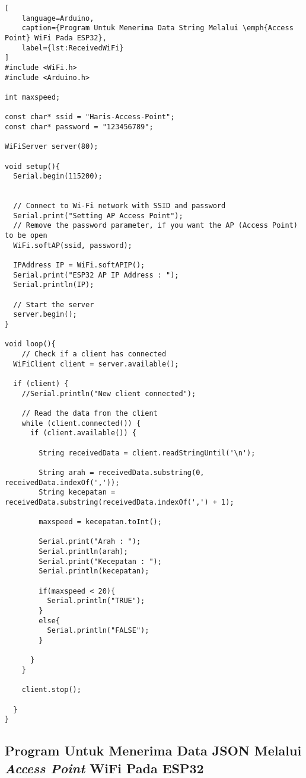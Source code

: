 \begin{lstlisting}[
    language=Arduino,
    caption={Program Untuk Menerima Data String Melalui \emph{Access Point} WiFi Pada ESP32},
    label={lst:ReceivedWiFi}
]
#include <WiFi.h>
#include <Arduino.h>

int maxspeed;

const char* ssid = "Haris-Access-Point";
const char* password = "123456789";

WiFiServer server(80);

void setup(){
  Serial.begin(115200);


  // Connect to Wi-Fi network with SSID and password
  Serial.print("Setting AP Access Point");
  // Remove the password parameter, if you want the AP (Access Point) to be open
  WiFi.softAP(ssid, password);
 
  IPAddress IP = WiFi.softAPIP();
  Serial.print("ESP32 AP IP Address : ");
  Serial.println(IP);

  // Start the server
  server.begin();
}

void loop(){
    // Check if a client has connected
  WiFiClient client = server.available();

  if (client) {
    //Serial.println("New client connected");
    
    // Read the data from the client
    while (client.connected()) {
      if (client.available()) {
    
        String receivedData = client.readStringUntil('\n');

        String arah = receivedData.substring(0, receivedData.indexOf(','));
        String kecepatan = receivedData.substring(receivedData.indexOf(',') + 1);

        maxspeed = kecepatan.toInt();

        Serial.print("Arah : ");
        Serial.println(arah);
        Serial.print("Kecepatan : ");
        Serial.println(kecepatan);

        if(maxspeed < 20){
          Serial.println("TRUE");
        }
        else{
          Serial.println("FALSE");
        }

      }
    }

    client.stop();

  }
}
\end{lstlisting}

\subsection{Program Untuk Menerima Data JSON Melalui \emph{Access Point} WiFi Pada ESP32}

